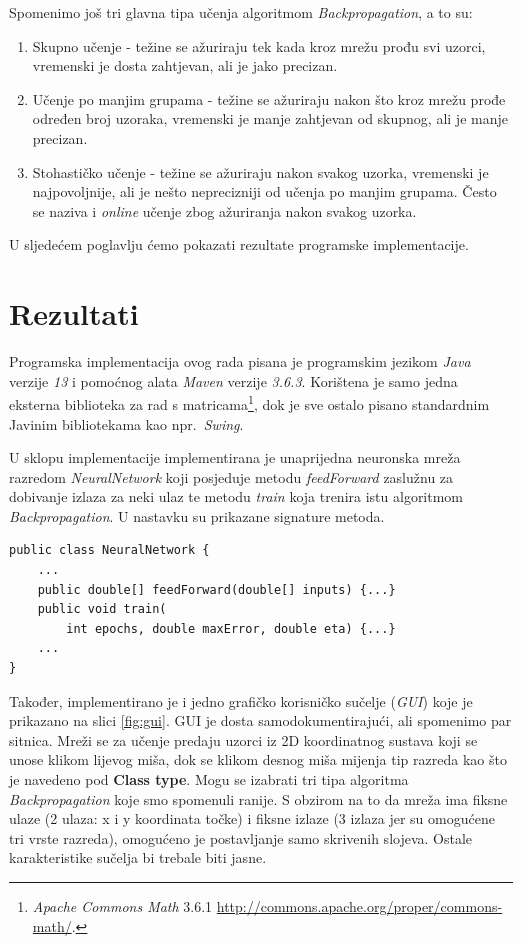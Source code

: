 \documentclass[times, utf8, zavrsni]{fer}
\begin{document}
\bigskip

Spomenimo još tri glavna tipa učenja algoritmom \textit{Backpropagation}, a to su:
\begin{enumerate}
    \item Skupno učenje  - težine se ažuriraju tek kada kroz mrežu prođu svi uzorci, vremenski je dosta zahtjevan, ali je jako precizan.
    \item Učenje po manjim grupama  - težine se ažuriraju nakon što kroz mrežu prođe određen broj uzoraka, vremenski je manje zahtjevan od skupnog, ali je manje precizan.
    \item Stohastičko učenje  - težine se ažuriraju nakon svakog uzorka, vremenski je najpovoljnije, ali je nešto neprecizniji od učenja po manjim grupama. Često se naziva i \textit{online} učenje zbog ažuriranja nakon svakog uzorka.
\end{enumerate}

\bigskip
\bigskip

U sljedećem poglavlju ćemo pokazati rezultate programske implementacije.

\chapter{Rezultati}
Programska implementacija ovog rada pisana je programskim jezikom \textit{Java} verzije \textit{13} i pomoćnog alata \textit{Maven} verzije \textit{3.6.3}. Korištena je samo jedna eksterna biblioteka za rad s matricama\footnote{\textit{Apache Commons Math} 3.6.1 \url{http://commons.apache.org/proper/commons-math/}.}, dok je sve ostalo pisano standardnim Javinim bibliotekama kao npr.\ \textit{Swing}.

U sklopu implementacije implementirana je unaprijedna neuronska mreža razredom \textit{NeuralNetwork} koji posjeduje metodu \textit{feedForward} zaslužnu za dobivanje izlaza za neki ulaz te metodu \textit{train} koja trenira istu algoritmom \textit{Backpropagation}. U nastavku su prikazane signature metoda.
\begin{lstlisting}
public class NeuralNetwork {
    ...
    public double[] feedForward(double[] inputs) {...}
    public void train(
        int epochs, double maxError, double eta) {...}
    ...
}
\end{lstlisting}
Također, implementirano je i jedno grafičko korisničko sučelje (\textit{GUI}) koje je prikazano na slici \ref{fig:gui}. GUI je dosta samodokumentirajući, ali spomenimo par sitnica. Mreži se za učenje predaju uzorci iz 2D koordinatnog sustava koji se unose klikom lijevog miša, dok se klikom desnog miša mijenja tip razreda kao što je navedeno pod \textbf{Class type}. Mogu se izabrati tri tipa algoritma \textit{Backpropagation} koje smo spomenuli ranije. S obzirom na to da mreža ima fiksne ulaze (2 ulaza: x i y koordinata točke) i fiksne izlaze (3 izlaza jer su omogućene tri vrste razreda), omogućeno je postavljanje samo skrivenih slojeva. Ostale karakteristike sučelja bi trebale biti jasne. 
\end{document}
